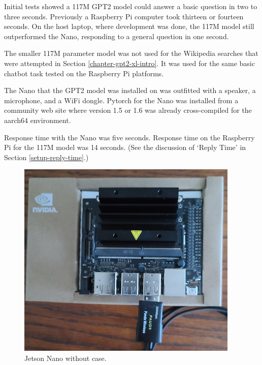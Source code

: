 Initial tests showed a 117M GPT2 model could answer a basic question in two to three seconds. Previously a Raspberry Pi computer took thirteen or fourteen seconds. On the host laptop, where development was done, the 117M model still outperformed the Nano, responding to a general question in one second.

The smaller 117M parameter model was not used for the Wikipedia searches that were attempted in Section \ref{chapter-gpt2-xl-intro}. It was used for the same basic chatbot task tested on the Raspberry Pi platforms.


The Nano that the GPT2 model was installed on was outfitted with a speaker, a microphone, and a WiFi dongle. Pytorch for the Nano was installed from a community web site where version 1.5 or 1.6 was already cross-compiled for the aarch64 environment. 

Response time with the Nano was five seconds. Response time on the Raspberry Pi for the 117M model was 14 seconds. (See the discussion of `Reply Time' in Section \ref{setup-reply-time}.)

\begin{figure}[H]
	\begin{center}
		\includegraphics[scale=0.9]{diagram-jetson-nano-02}
		
		
	\end{center}
	\caption[Jetson Nano]{Jetson Nano without case.}
	
	
\end{figure}
